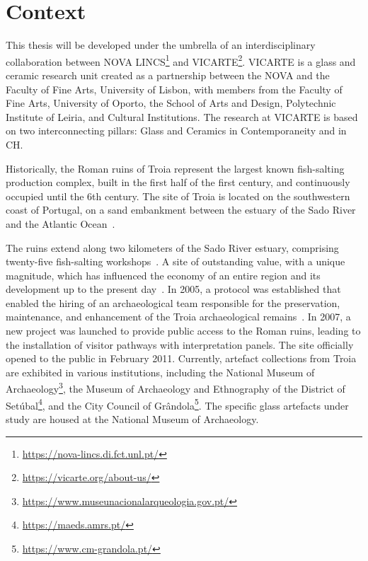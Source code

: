 \section{Context}
\label{sec:context}

This thesis will be developed under the umbrella of an interdisciplinary collaboration between NOVA LINCS\footnote{\url{https://nova-lincs.di.fct.unl.pt/}} and \gls{VICARTE}\footnote{\url{https://vicarte.org/about-us/}}.
\gls{VICARTE} is a glass and ceramic research unit created as a partnership between the \gls{NOVA} and the Faculty of Fine Arts, University of Lisbon, with members from the Faculty of Fine Arts, University of Oporto, the School of Arts and Design, Polytechnic Institute of Leiria, and Cultural Institutions.
The research at \gls{VICARTE} is based on two interconnecting pillars: Glass and Ceramics in Contemporaneity and in \gls{CH}. 

Historically, the Roman ruins of Troia represent the largest known fish-salting production complex, built in the first half of the first century, and continuously occupied until the 6th century. 
The site of Troia is located on the southwestern coast of Portugal, on a sand embankment between the estuary of the Sado River and the Atlantic Ocean~\cite{pinto2018reassessment}.

The ruins extend along two kilometers of the Sado River estuary, comprising twenty-five fish-salting workshops~\cite{hocquet2015fish}.
A site of outstanding value, with a unique magnitude, which has influenced the economy of an entire region and its development up to the present day~\cite{unesco_troia}.
In 2005, a protocol was established that enabled the hiring of an archaeological team responsible for the preservation, maintenance, and enhancement of the Troia archaeological remains~\cite{pinto2014ruinas}. In 2007,
a new project was launched to provide public access to the Roman ruins, leading to the installation of visitor pathways with interpretation panels. The site officially opened to the public in February 2011. 
Currently, artefact collections from Troia are exhibited in various institutions, including the National Museum of Archaeology\footnote{\url{https://www.museunacionalarqueologia.gov.pt/}}, the Museum of Archaeology and Ethnography of the District of Setúbal\footnote{\url{https://maeds.amrs.pt/}}, and the City Council of Grândola\footnote{\url{https://www.cm-grandola.pt/}}. The specific glass artefacts under study are housed at the National Museum of Archaeology.




